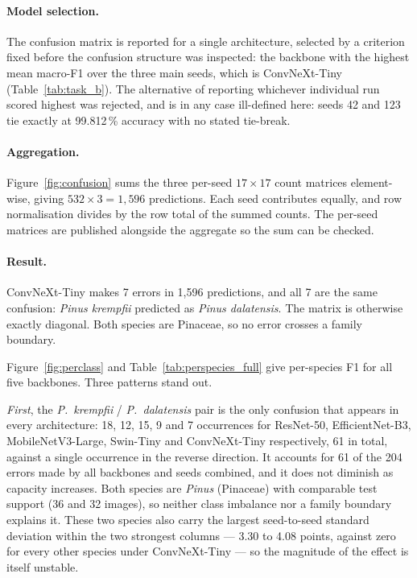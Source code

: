 \paragraph{Model selection.} The confusion matrix is reported for a single
architecture, selected by a criterion fixed before the confusion structure
was inspected: the backbone with the highest mean macro-F1 over the three
main seeds, which is ConvNeXt-Tiny (Table~\ref{tab:task_b}). The
alternative of reporting whichever individual run scored highest was
rejected, and is in any case ill-defined here: seeds 42 and 123 tie exactly
at 99.812\,\% accuracy with no stated tie-break.

\paragraph{Aggregation.} Figure~\ref{fig:confusion} sums the three per-seed
$17\times17$ count matrices element-wise, giving $532\times3 = 1{,}596$
predictions. Each seed contributes equally, and row normalisation divides by
the row total of the summed counts. The per-seed matrices are published
alongside the aggregate so the sum can be checked.

\paragraph{Result.} ConvNeXt-Tiny makes 7 errors in 1{,}596 predictions, and
all 7 are the same confusion: \textit{Pinus krempfii} predicted as
\textit{Pinus dalatensis}. The matrix is otherwise exactly diagonal. Both
species are Pinaceae, so no error crosses a family boundary.

Figure~\ref{fig:perclass} and Table~\ref{tab:perspecies_full} give per-species
F1 for all five backbones. Three patterns stand out.

\textit{First}, the \textit{P.\ krempfii} / \textit{P.\ dalatensis} pair is
the only confusion that appears in every architecture: 18, 12, 15, 9 and 7
occurrences for ResNet-50, EfficientNet-B3, MobileNetV3-Large, Swin-Tiny and
ConvNeXt-Tiny respectively, 61 in total, against a single occurrence in the
reverse direction. It accounts for 61 of the 204 errors made by all
backbones and seeds combined, and it does not diminish as capacity
increases. Both species are \textit{Pinus} (Pinaceae) with comparable test
support (36 and 32 images), so neither class imbalance nor a family boundary
explains it. These two species also carry the largest seed-to-seed standard
deviation within the two strongest columns --- 3.30 to 4.08 points, against
zero for every other species under ConvNeXt-Tiny --- so the magnitude of the
effect is itself unstable.


